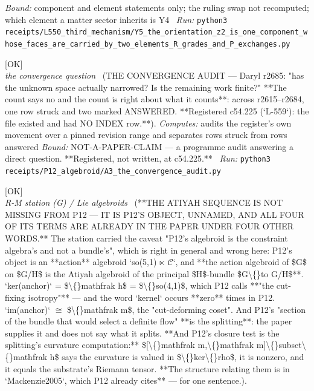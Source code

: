 \begin{description}
 \emph{Bound:} component and element statements only; the ruling swap not recomputed; which element a matter sector inherits is Y4
\ \emph{Run:} \texttt{python3 receipts/L550\_third\_mechanism/Y5\_the\_orientation\_z2\_is\_one\_component\_whose\_faces\_are\_carried\_by\_two\_elements\_R\_grades\_and\_P\_exchanges.py}
\item[\rcptlabel{A3_the_convergence_audit}{P12R17}\textbf{P12R17}\quad\texttt{A3\_the\_convergence\_audit}]\hfill\textsf{[OK]}\\
\textit{the convergence question} \ (THE CONVERGENCE AUDIT --- Daryl r2685: "has the unknown space actually narrowed? Is the remaining work finite?" **The count says no and the count is right about what it counts**: across r2615--r2684, one row struck and two marked ANSWERED. **Registered c54.225 (`L-559`): the file existed and had NO INDEX row.**). 
\emph{Computes:} audits the register's own movement over a pinned revision range and separates rows struck from rows answered
 \emph{Bound:} NOT-A-PAPER-CLAIM --- a programme audit answering a direct question. **Registered, not written, at c54.225.**
\ \emph{Run:} \texttt{python3 receipts/P12\_algebroid/A3\_the\_convergence\_audit.py}
\item[\label{rcpt:A1_the_atiyah_sequence_is_not_missing_from_P12_it_is_P12s_object_unnamed}\textbf{}\quad\texttt{A1\_the\_atiyah\_sequence\_is\_not\_missing\_from\_P12\_it\_is\_P12s\_object\_unnamed}]\hfill\textsf{[OK]}\\
\textit{R-M station (G) / Lie algebroids} \ (**THE ATIYAH SEQUENCE IS NOT MISSING FROM P12 --- IT IS P12'S OBJECT, UNNAMED, AND ALL FOUR OF ITS TERMS ARE ALREADY IN THE PAPER UNDER FOUR OTHER WORDS.** The station carried the caveat "P12's algebroid is the constraint algebra's and not a bundle's", which is right in general and wrong here: P12's object is an **action** algebroid `so(5,1) \ensuremath{\ltimes} \ensuremath{\mathcal{C}}`, and **the action algebroid of \$G\$ on \$G/H\$ is the Atiyah algebroid of the principal \$H\$-bundle \$G\textbackslash\{\}to G/H\$**. `ker(anchor)` = \$\textbackslash\{\}mathfrak h\$ = \$\textbackslash\{\}so(4,1)\$, which P12 calls **"the cut-fixing isotropy"** --- and the word `kernel` occurs **zero** times in P12. `im(anchor)` \ensuremath{\cong} \$\textbackslash\{\}mathfrak m\$, the "cut-deforming coset". And P12's "section of the bundle that would select a definite flow" **is the splitting**: the paper supplies it and does not say what it splits. **And P12's closure test is the splitting's curvature computation:** \$[\textbackslash\{\}mathfrak m,\textbackslash\{\}mathfrak m]\textbackslash\{\}subset\textbackslash\{\}mathfrak h\$ says the curvature is valued in \$\textbackslash\{\}ker\textbackslash\{\}rho\$, it is nonzero, and it equals the substrate's Riemann tensor. **The structure relating them is in `Mackenzie2005`, which P12 already cites** --- for one sentence.). 

\end{description}
